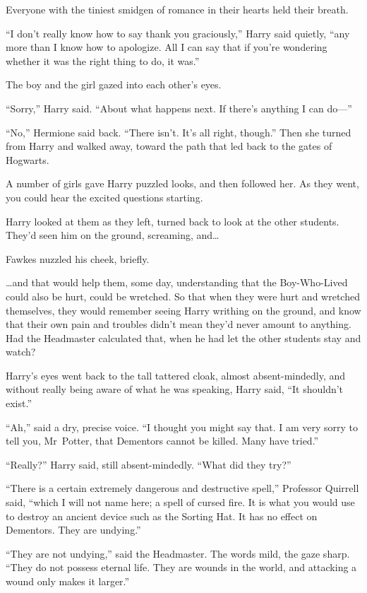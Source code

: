 Everyone with the tiniest smidgen of romance in their hearts held their breath.

“I don’t really know how to say thank you graciously,” Harry said quietly, “any more than I know how to apologize. All I can say that if you’re wondering whether it was the right thing to do, it was.”

The boy and the girl gazed into each other’s eyes.

“Sorry,” Harry said. “About what happens next. If there’s anything I can do—”

“No,” Hermione said back. “There isn’t. It’s all right, though.” Then she turned from Harry and walked away, toward the path that led back to the gates of Hogwarts.

A number of girls gave Harry puzzled looks, and then followed her. As they went, you could hear the excited questions starting.

Harry looked at them as they left, turned back to look at the other students. They’d seen him on the ground, screaming, and…

Fawkes nuzzled his cheek, briefly.

…and that would help them, some day, understanding that the Boy-Who-Lived could also be hurt, could be wretched. So that when they were hurt and wretched themselves, they would remember seeing Harry writhing on the ground, and know that their own pain and troubles didn’t mean they’d never amount to anything. Had the Headmaster calculated that, when he had let the other students stay and watch?

Harry’s eyes went back to the tall tattered cloak, almost absent-mindedly, and without really being aware of what he was speaking, Harry said, “It shouldn’t exist.”

“Ah,” said a dry, precise voice. “I thought you might say that. I am very sorry to tell you, Mr~Potter, that Dementors cannot be killed. Many have tried.”

“Really?” Harry said, still absent-mindedly. “What did they try?”

“There is a certain extremely dangerous and destructive spell,” Professor Quirrell said, “which I will not name here; a spell of cursed fire. It is what you would use to destroy an ancient device such as the Sorting Hat. It has no effect on Dementors. They are undying.”

“They are not undying,” said the Headmaster. The words mild, the gaze sharp. “They do not possess eternal life. They are wounds in the world, and attacking a wound only makes it larger.”

